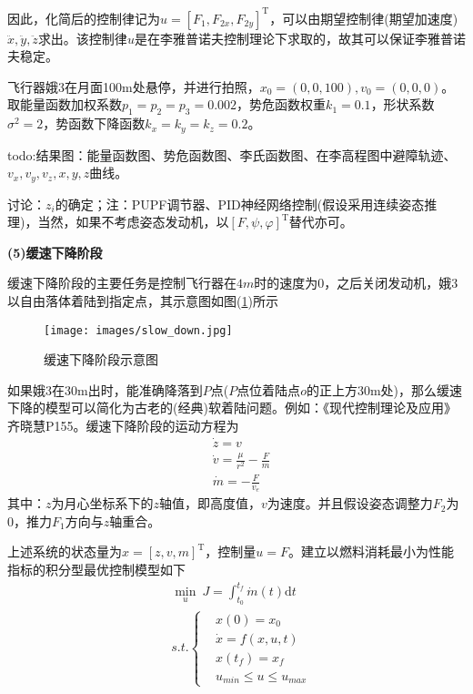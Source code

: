             因此，化简后的控制律记为$u=[F_1,F_{2x},F_{2y}]^\mathrm{T}$，可以由期望控制律(期望加速度)$\ddot{x},\ddot{y},\ddot{z}$求出。该控制律$u$是在李雅普诺夫控制理论下求取的，故其可以保证李雅普诺夫稳定。
            \par
            飞行器娥3在月面100m处悬停，并进行拍照，$x_0 = (0,0,100),v_0=(0,0,0)$。取能量函数加权系数$p_1=p_2=p_3=0.002$，势危函数权重$k_1=0.1$，形状系数$\sigma^2=2$，势函数下降函数$k_x=k_y=k_z= 0.2$。
            \par
            todo:结果图：能量函数图、势危函数图、李氏函数图、在李高程图中避障轨迹、$v_x,v_y,v_z,x,y,z$曲线。
            \par
            讨论：$z_i$的确定；注：PUPF调节器、PID神经网络控制(假设采用连续姿态推理)，当然，如果不考虑姿态发动机，以$[F,\psi,\varphi]^\mathrm{T}$替代亦可。
            \par
            \textbf{(5)缓速下降阶段}
            \par
            缓速下降阶段的主要任务是控制飞行器在$4m$时的速度为0，之后关闭发动机，娥3以自由落体着陆到指定点，其示意图如图(\ref{fig:缓速下降阶段示意图})所示
            \begin{figure}[H]
            \centering
            \texttt{[image: images/slow\_down.jpg]}
            \caption{缓速下降阶段示意图}
            \label{fig:缓速下降阶段示意图}
            \end{figure}
            \par
            如果娥3在30m出时，能准确降落到$P$点($P$点位着陆点$o$的正上方30m处)，那么缓速下降的模型可以简化为古老的(经典)软着陆问题。例如：《现代控制理论及应用》齐晓慧P155。缓速下降阶段的运动方程为
            \begin{align*}
            & \dot{z} = v\\
            & \dot{v} = \frac{\mu}{r^2} - \frac{F}{m}\\
            & \dot{m} = -\frac{F}{v_e}
            \end{align*}
            其中：$z$为月心坐标系下的$z$轴值，即高度值，$v$为速度。并且假设姿态调整力$F_2$为0，推力$F_1$方向与$z$轴重合。
            \par
            上述系统的状态量为$x = [z,v,m]^\mathrm{T}$，控制量$u = F$。建立以燃料消耗最小为性能指标的积分型最优控制模型如下
            \begin{align*}
            & \min_u\ J = \int_{t_0}^{t_f} \dot{m}(t)\mathrm{d}t\\
            & s.t.\left\{
            \begin{aligned}
            & x(0) = x_0\\
            & \dot{x} = f(x,u,t)\\
            & x(t_f) = x_f\\
            & u_{min} \leqslant u \leqslant u_{max}
            \end{aligned}
            \right.
            \end{align*}

